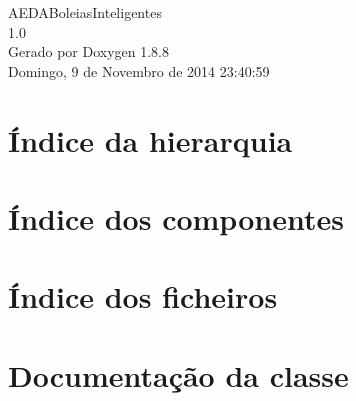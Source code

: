 \documentclass[twoside]{book}
\newcommand{\+}{\discretionary{\mbox{\scriptsize$\hookleftarrow$}}{}{}}
\newcommand{\clearemptydoublepage}{%
  \newpage{\pagestyle{empty}\cleardoublepage}%
}
\begin{document}
\hypersetup{pageanchor=false,
             bookmarks=true,
             bookmarksnumbered=true,
             pdfencoding=unicode
            }
\begin{titlepage}
\vspace*{7cm}
\begin{center}%
{\Large A\+E\+D\+A\+Boleias\+Inteligentes \\[1ex]\large 1.\+0 }\\
\vspace*{1cm}
{\large Gerado por Doxygen 1.8.8}\\
\vspace*{0.5cm}
{\small Domingo, 9 de Novembro de 2014 23:40:59}\\
\end{center}
\end{titlepage}
\clearemptydoublepage
\tableofcontents
\clearemptydoublepage
{}
\hypersetup{pageanchor=true}

\chapter{Índice da hierarquia}

\chapter{Índice dos componentes}

\chapter{Índice dos ficheiros}

\chapter{Documentação da classe}





























\end{document}

